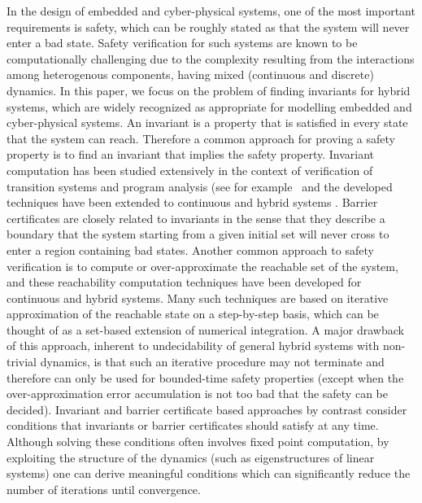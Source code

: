 In the design of embedded and cyber-physical systems, one of the most
important requirements is safety, which can be roughly stated as that
the system will never enter a bad state. Safety verification for such
systems are known to be computationally challenging due to the
complexity resulting from the interactions among heterogenous
components, having mixed (continuous and discrete) dynamics. In this
paper, we focus on the problem of finding invariants for hybrid
systems, which are widely recognized as appropriate for modelling
embedded and cyber-physical systems. An invariant is a property that
is satisfied in every state that the system can reach. Therefore a
common approach for proving a safety property is to find an invariant
that implies the safety property. Invariant computation has been
studied extensively in the context of verification of transition
systems and program analysis (see for
example~\cite{CousotHalbwachs78,DBLP:journals/fmsd/BensalemL99,DBLP:conf/tacas/TiwariRSS01,DBLP:conf/cav/ColonSS03,DBLP:conf/sas/Goubault13}
and the developed techniques have been extended to continuous and
hybrid
systems \cite{DBLP:conf/hybrid/SankaranarayananSM04,jeannet2009apron,DBLP:conf/hybrid/Rodriguez-CarbonellT05,DBLP:conf/cdc/SassiGS14,DBLP:journals/tecs/AllamigeonGSGP16,HybridFluctuat,DBLP:conf/vmcai/SogokonGJP16,DBLP:conf/aplas/DangG11}. Barrier
certificates \cite{prajna2004safety} are closely related to invariants
in the sense that they describe a boundary that the system starting
from a given initial set will never cross to enter a region containing
bad states. Another common approach to safety verification is to
compute or over-approximate the reachable set of the system, and these
reachability computation techniques have been developed for continuous
and hybrid systems.  Many such techniques are based on iterative
approximation of the reachable state on a step-by-step basis, which
can be thought of as a set-based extension of numerical integration. A
major drawback of this approach, inherent to undecidability of general
hybrid systems with non-trivial dynamics, is that such an iterative
procedure may not terminate and therefore can only be used for bounded-time
safety properties (except when the over-approximation error accumulation is not
too bad that the safety can be decided). Invariant and barrier
certificate based approaches by contrast consider conditions that
invariants or barrier certificates should satisfy at any
time. Although solving these conditions often involves fixed point
computation, by exploiting the structure of the dynamics (such as
eigenstructures of linear systems) one can derive meaningful
conditions which can significantly reduce the number of iterations
until convergence.

